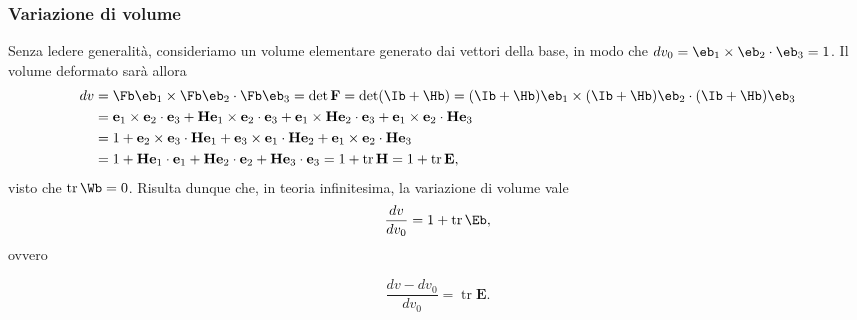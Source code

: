 \subsubsection{Variazione di volume}
Senza ledere generalità, consideriamo un volume elementare generato dai vettori della base, in modo che $dv_0=\eb_1\times\eb_2\cdot\eb_3=1$. Il volume deformato sarà allora
\begin{equation}
	\begin{aligned}
	dv&=\Fb\eb_1\times\Fb\eb_2\cdot\Fb\eb_3=\det\mathbf{F}=\det(\Ib+\Hb)=(\Ib+\Hb)\eb_1\times(\Ib+\Hb)\eb_2\cdot(\Ib+\Hb)\eb_3\\
	&=\mathbf{e}_{1}\times\mathbf{e}_{2}\cdot\mathbf{e}_{3}+\mathbf{H}\mathbf{e}_{1}\times\mathbf{e}_{2}\cdot\mathbf{e}_{3}+\mathbf{e}_{1}\times\mathbf{H}\mathbf{e}_{2}\cdot\mathbf{e}_{3}+\mathbf{e}_{1}\times\mathbf{e}_{2}\cdot\mathbf{H}\mathbf{e}_{3}\\&=1+\mathbf{e}_{2}\times\mathbf{e}_{3}\cdot\mathbf{H}\mathbf{e}_{1}+\mathbf{e}_{3}\times\mathbf{e}_{1}\cdot\mathbf{H}\mathbf{e}_{2}+\mathbf{e}_{1}\times\mathbf{e}_{2}\cdot\mathbf{H}\mathbf{e}_{3}\\&=1+\mathbf{H}\mathbf{e}_{1}\cdot\mathbf{e}_{1}+\mathbf{H}\mathbf{e}_{2}\cdot\mathbf{e}_{2}+\mathbf{H}\mathbf{e}_{3}\cdot\mathbf{e}_{3}=1+\operatorname{tr}\mathbf{H}=1+\operatorname{tr}\mathbf{E},
\end{aligned}
\end{equation}
visto che $\operatorname{tr}\Wb=0$. Risulta dunque che, in teoria infinitesima, la variazione di volume vale
\begin{equation}
	\frac{dv}{dv_0}=1+\operatorname{tr}\Eb,
\end{equation}
ovvero
\begin{definition}
	\begin{equation}\label{trE}
	\frac{dv-dv_0}{dv_0}=\operatorname{tr}\mathbf{E}.
\end{equation}
\end{definition}



